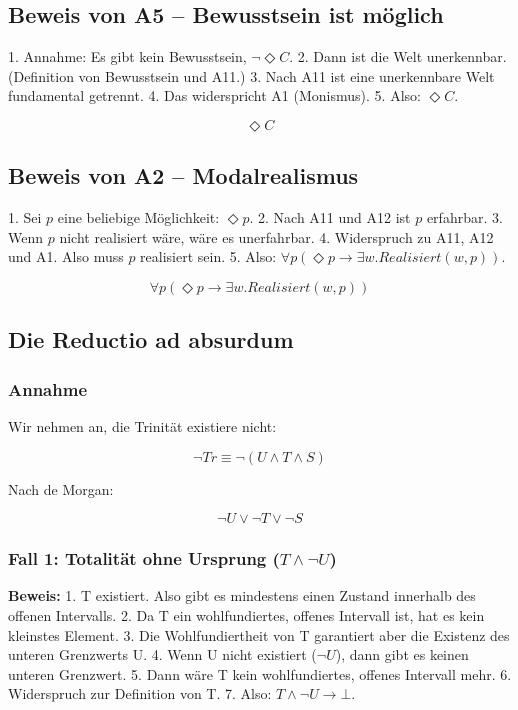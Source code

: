 \documentclass[
]{article}
\begin{document}
\subsection{Beweis von A5 – Bewusstsein ist möglich}\label{beweis-von-a5-bewusstsein-ist-moumlglich}

1. Annahme: Es gibt kein Bewusstsein, \(\neg \Diamond C\).
2. Dann ist die Welt unerkennbar. (Definition von Bewusstsein und A11.)
3. Nach A11 ist eine unerkennbare Welt fundamental getrennt.
4. Das widerspricht A1 (Monismus).
5. Also: \(\Diamond C\).

\[
\boxed{\Diamond C}
\]

\subsection{Beweis von A2 – Modalrealismus}\label{beweis-von-a2-modalrealismus}

1. Sei \(p\) eine beliebige Möglichkeit: \(\Diamond p\).
2. Nach A11 und A12 ist \(p\) erfahrbar.
3. Wenn \(p\) nicht realisiert wäre, wäre es unerfahrbar.
4. Widerspruch zu A11, A12 und A1. Also muss \(p\) realisiert sein.
5. Also: \(\forall p(\Diamond p \rightarrow \exists w. Realisiert(w,p))\).

\[
\boxed{\forall p(\Diamond p \rightarrow \exists w. Realisiert(w,p))}
\]

\subsection{Die Reductio ad absurdum}\label{die-reductio-ad-absurdum}

\subsubsection{Annahme}\label{annahme}

Wir nehmen an, die Trinität existiere nicht:

\[
\neg Tr \equiv \neg(U \land T \land S)
\]

Nach de Morgan:

\[
\neg U \lor \neg T \lor \neg S
\]

\subsubsection{Fall 1: Totalität ohne Ursprung (\(T \land \neg U\))}\label{fall-1-totalituxe4t-ohne-ursprung-t-land-neg-u}

\textbf{Beweis:}
1. T existiert. Also gibt es mindestens einen Zustand innerhalb des offenen Intervalls.
2. Da T ein wohlfundiertes, offenes Intervall ist, hat es kein kleinstes Element.
3. Die Wohlfundiertheit von T garantiert aber die Existenz des unteren Grenzwerts U.
4. Wenn U nicht existiert (\(\neg U\)), dann gibt es keinen unteren Grenzwert.
5. Dann wäre T kein wohlfundiertes, offenes Intervall mehr.
6. Widerspruch zur Definition von T.
7. Also: \(T \land \neg U \rightarrow \bot\).
\end{document}
